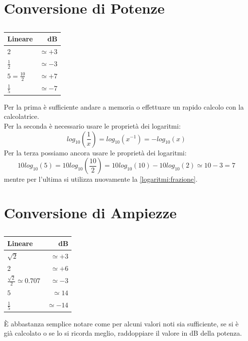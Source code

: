 \documentclass[a4paper,11pt]{report}
\begin{document}
\section{Conversione di Potenze}
\begin{table}[H]
  \caption{}
  \label{tab:}

  \begin{center}
    \begin{tabular}{|l|r|}
    \hline
    Lineare                 & dB\\
    \hline
       2                    & $\simeq +3$ \\
    \hline
       $\frac{1}{2}$        & $\simeq -3$ \\
    \hline
       $5 = \frac{10}{2}$   & $\simeq +7$ \\
    \hline
       $\frac{1}{5}$        & $\simeq -7$ \\
    \hline
    \end{tabular}
  \end{center}
\end{table}
Per la prima è sufficiente andare a memoria o effettuare un rapido calcolo con la calcolatrice.\\
Per la seconda è necessario usare le proprietà dei logaritmi:
\begin{equation}
  \label{logaritmi:frazione}
  log_{10}(\frac{1}{x}) = log_{10}(x^{-1}) = -log_{10}(x)  
\end{equation}
Per la terza possiamo ancora usare le proprietà dei logaritmi:
\begin{equation}
  \label{logaritmi:differenza}
  10log_{10}(5) = 10log_{10}(\frac{10}{2}) = 10log_{10}(10)-10log_{10}(2) \simeq 10 - 3 = 7  
\end{equation}
mentre per l'ultima si utilizza nuovamente la \ref{logaritmi:frazione}.
\section{Conversione di Ampiezze}
\begin{table}[H]
  \caption{}
  \label{tab:}

  \begin{center}
    \begin{tabular}{|l|r|}
    \hline
    Lineare                               & dB\\
    \hline
       $\sqrt{2}$                         & $\simeq +3$ \\
    \hline
       2                                  & $\simeq +6$ \\
    \hline
       $\frac{\sqrt{2}}{2} \simeq 0.707$  & $\simeq -3$ \\
    \hline
       $5$                                & $\simeq 14$ \\
    \hline
       $\frac{1}{5}$                      & $\simeq -14$ \\
    \hline
    \end{tabular}
  \end{center}
\end{table}
È abbastanza semplice notare come per alcuni valori noti sia sufficiente, se si è già calcolato o se lo si ricorda meglio, raddoppiare il valore in dB della potenza.
\end{document}
